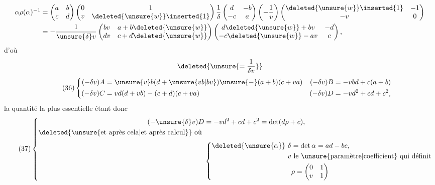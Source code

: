 \[
\begin{aligned}
\alpha\rho(\alpha)^{-1}
&=\begin{pmatrix}a&b\\c&d\end{pmatrix}
\begin{pmatrix}0&1\\v&\deleted{\unsure{w}}\inserted{1}\end{pmatrix}
\frac1\delta\begin{pmatrix}d&-b\\-c&a\end{pmatrix}
\left(-\frac1v\right)
\begin{pmatrix}\deleted{\unsure{w}}\inserted{1}&-1\\-v&0\end{pmatrix}\\
&=-\frac1{\unsure{\delta}v}
\begin{pmatrix}bv&a+b\deleted{\unsure{w}}\\dv&c+d\deleted{\unsure{w}}\end{pmatrix}
\begin{pmatrix}d\deleted{\unsure{w}}+bv&-d\\-c\deleted{\unsure{w}}-av&c\end{pmatrix},
\end{aligned}
\]
d'où
\[
\deleted{\unsure{=\frac1{\delta v}}}
\]
\[
\tag{36}
\left\{\begin{aligned}
(-\delta v)A&=\unsure{v}b(d+\unsure{vb|bv})\unsure{-}(a+b)(c+va)
&(-\delta v)B&=-vbd+c(a+b)\\
(-\delta v)C&=vd(d+vb)-(c+d)(c+va)
&(-\delta v)D&=-vd^2+cd+c^2,
\end{aligned}\right.
\]
la quantité la plus essentielle étant donc
\[
\tag{37}
\left\{\begin{aligned}
(-\unsure{\delta}v)D&=-vd^2+cd+c^2=\det(d\rho+c),\\
\text{\deleted{\unsure{et après cela|et après calcul}} où }&\\[3pt]
&\left\{\begin{aligned}
\deleted{\unsure{\alpha}}\ \delta&=\det\alpha=ad-bc,\\
v&\ \text{le \unsure{paramètre|coefficient} qui définit }\\&\rho=\begin{pmatrix}0&1\\v&1\end{pmatrix}
\end{aligned}\right.
\end{aligned}\right.
\]
